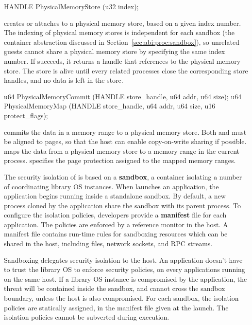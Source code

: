 \begin{paldef}
HANDLE PhysicalMemoryStore  (u32 index);
\end{paldef}


 creates or attaches to a physical memory store,
based on a given index number.
The indexing of physical memory stores is independent for each sandbox (the container abstraction discussed in Section~\ref{sec:abi:proc:sandbox}),
so unrelated guests cannot share a physical memory store by specifying the same index number.
If  succeeds,
it returns a handle that references to the physical memory store.
The store is alive until every related processes close the corresponding store handles,
and no data is left in the store.




\begin{paldef}
u64 PhysicalMemoryCommit (HANDLE store_handle, u64 addr, u64 size);
u64 PhysicalMemoryMap    (HANDLE store_handle, u64 addr, u64 size,
                          u16 protect_flags);
\end{paldef}


 commits the data in a memory range to a physical memory store.
Both  and  must be aligned to pages,
so that the host can enable copy-on-write sharing if possible.
 maps the data from a physical memory store
to a memory range in the current process.
 specifies the page protection assigned to the mapped memory ranges.




\label{sec:abi:proc:sandbox}


The security isolation of \graphene{} is based on a {\bf sandbox}, a container isolating a number of coordinating library OS instances.
When \graphene{} launches an application, the application begins running inside a standalone sandbox.
By default, a new process cloned by the application share the sandbox
with its parent process.
To configure the isolation policies,
developers provide a {\bf manifest} file for each application.
The policies are enforced by a reference monitor in the host.
A manifest file contains run-time rules for sandboxing resources which can be shared in the host,
including files, network sockets, and RPC streams.



Sandboxing delegates
security isolation to the host.
An application doesn't have to trust the library OS
to enforce security policies,
on every applications running on the same host.
If a library OS instance is compromised by the application,
the threat will be contained inside the sandbox,
and cannot cross the sandbox boundary, unless the host is also compromised.
For each sandbox,
the isolation policies are statically assigned,
in the manifest file given at the launch.
The isolation policies
cannot be subverted during execution.



